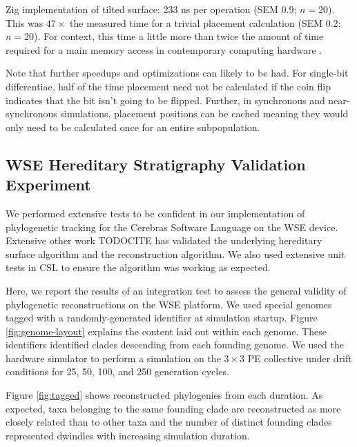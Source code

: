 Zig implementation of tilted surface:
233 ns per operation (SEM 0.9; $n=20$).
This was $47\times$ the measured time for a trivial placement calculation (SEM 0.2; $n=20$).
For context, this time a little more than twice the amount of time required for a main memory access in contemporary computing hardware \citep{markus2022memory}.

Note that further speedups and optimizations can likely to be had.
For single-bit differentiae, half of the time placement need not be calculated if the coin flip indicates that the bit isn't going to be flipped.
Further, in synchronous and near-synchronous simulations, placement positions can be cached meaning they would only need to be calculated once for an entire subpopulation.

\subsection{WSE Hereditary Stratigraphy Validation Experiment}

We performed extensive tests to be confident in our implementation of phylogenetic tracking for the Cerebras Software Language on the WSE device.
Extensive other work TODOCITE has validated the underlying hereditary surface algorithm and the reconstruction algorithm.
We also used extensive unit tests in CSL to ensure the algorithm was working as expected.

Here, we report the results of an integration test to assess the general validity of phylogenetic reconstructions on the WSE platform.
We used special genomes tagged with a randomly-generated identifier at simulation startup.
Figure \ref{fig:genome-layout} explains the content laid out within each genome.
These identifiers identified clades descending from each founding genome.
We used the hardware simulator to perform a simulation on the $3\times3$ PE collective under drift conditions for 25, 50, 100, and 250 generation cycles.



Figure \ref{fig:tagged} shows reconstructed phylogenies from each duration.
As expected, taxa belonging to the same founding clade are reconstructed as more closely related than to other taxa and the number of distinct founding clades represented dwindles with increasing simulation duration.

